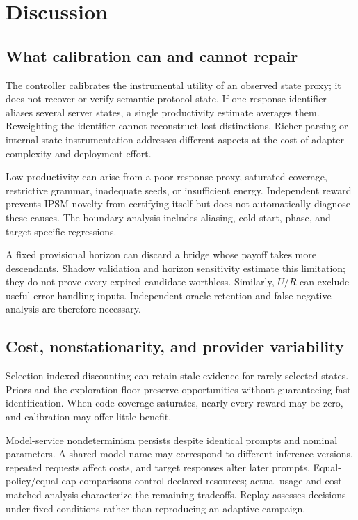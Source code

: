 \documentclass[final,5p,times,number]{elsarticle}
\begin{document}
\section{Discussion}
\subsection{What calibration can and cannot repair}
The controller calibrates the instrumental utility of an observed state proxy; it does not recover or verify semantic protocol state. If one response identifier aliases several server states, a single productivity estimate averages them. Reweighting the identifier cannot reconstruct lost distinctions. Richer parsing or internal-state instrumentation addresses different aspects at the cost of adapter complexity and deployment effort.

Low productivity can arise from a poor response proxy, saturated coverage, restrictive grammar, inadequate seeds, or insufficient energy. Independent reward prevents IPSM novelty from certifying itself but does not automatically diagnose these causes. The boundary analysis includes aliasing, cold start, phase, and target-specific regressions.

A fixed provisional horizon can discard a bridge whose payoff takes more descendants. Shadow validation and horizon sensitivity estimate this limitation; they do not prove every expired candidate worthless. Similarly, $U/R$ can exclude useful error-handling inputs. Independent oracle retention and false-negative analysis are therefore necessary.

\subsection{Cost, nonstationarity, and provider variability}
Selection-indexed discounting can retain stale evidence for rarely selected states. Priors and the exploration floor preserve opportunities without guaranteeing fast identification. When code coverage saturates, nearly every reward may be zero, and calibration may offer little benefit.

Model-service nondeterminism persists despite identical prompts and nominal parameters. A shared model name may correspond to different inference versions, repeated requests affect costs, and target responses alter later prompts. Equal-policy/equal-cap comparisons control declared resources; actual usage and cost-matched analysis characterize the remaining tradeoffs. Replay assesses decisions under fixed conditions rather than reproducing an adaptive campaign.
\end{document}
